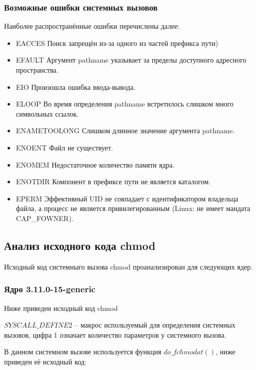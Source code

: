 \subsubsection{Возможные ошибки системных вызовов}
Наиболее распространённые ошибки перечислены далее:
\begin{itemize}
\item EACCES
Поиск запрещён из-за одного из частей префикса пути)
\item EFAULT
Аргумент pathname указывает за пределы доступного адресного пространства.
\item EIO
Произошла ошибка ввода-вывода.
\item ELOOP
Во время определения pathname встретилось слишком много символьных ссылок.
\item ENAMETOOLONG
Слишком длинное значение аргумента pathname.
\item ENOENT
Файл не существует.
\item ENOMEM
Недостаточное количество памяти ядра.
\item ENOTDIR
Компонент в префиксе пути не является каталогом.
\item EPERM
Эффективный UID не совпадает с идентификатором владельца файла, а процесс не является привилегированным (Linux: не имеет мандата CAP\_FOWNER).
\end{itemize}


\subsection{Анализ исходного кода chmod} %

\par Исходный код системныго вызова chmod проанализирован для следующих ядер.

\subsubsection{Ядро 3.11.0-15-generic}

\par Ниже приведен исходный код chmod


\par $SYSCALL\_DEFINE2$ -- макрос используемый для определения системных вызовов, цифра 1 означает количество параметров у системного вызова.

\par В данном системном вызове используется функция $do\_fchmodat()$, ниже приведен её исходный код:

